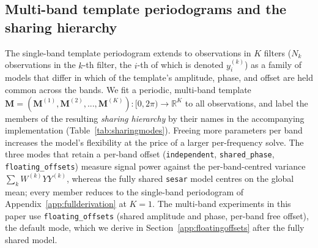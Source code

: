 \documentclass[apj]{emulateapj}
\newcommand{\Mt}{\mathbf{M}}
\newcommand{\yk}[1][k]{y^{(#1)}}
\newcommand{\Mtk}[1][k]{\Mt^{(#1)}}
\newcommand{\Wtk}[1][k]{W^{(#1)}}
\begin{document}
\begin{appendix}
\section{Multi-band template periodograms and the sharing hierarchy}\label{sec:shphmult}

The single-band template periodogram extends to observations in $K$ filters ($N_k$ observations in the $k$-th filter, the $i$-th of which is denoted $\yk_i$) as a family of models that differ in which of the template's amplitude, phase, and offset are held common across the bands. We fit a periodic, multi-band template $\Mt = (\Mtk[1], \Mtk[2], ..., \Mtk[K]): [0, 2\pi)\rightarrow \mathbb{R}^K$ to all observations, and label the members of the resulting \emph{sharing hierarchy} by their names in the accompanying implementation (Table~\ref{tab:sharingmodes}). Freeing more parameters per band increases the model's flexibility at the price of a larger per-frequency solve. The three modes that retain a per-band offset (\texttt{independent}, \texttt{shared\_phase}, \texttt{floating\_offsets}) measure signal power against the per-band-centred variance $\sum_k \Wtk YY^{(k)}$, whereas the fully shared \texttt{sesar} model centres on the global mean; every member reduces to the single-band periodogram of Appendix~\ref{app:fullderivation} at $K=1$. The multi-band experiments in this paper use \texttt{floating\_offsets} (shared amplitude and phase, per-band free offset), the default mode, which we derive in Section~\ref{app:floatingoffsets} after the fully shared model.


\end{appendix}
\end{document}
